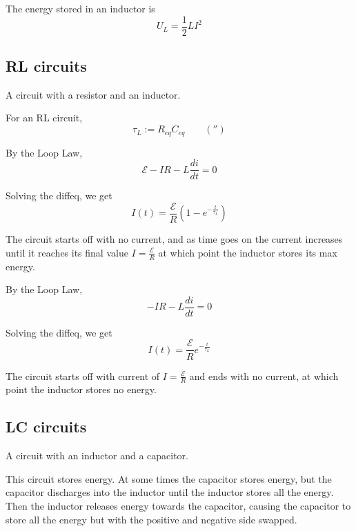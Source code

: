 \begin{theorem}
  The energy stored in an inductor is
  \[
    U_L = \frac{1}{2} LI^2
  \]
\end{theorem}

\subsection{RL circuits}

\begin{definition}[RL circuit]
  A circuit with a resistor and an inductor.
\end{definition}

\begin{definition}
  For an RL circuit,
  \[
    \tau_L := R_{eq} C_{eq} \qquad (\second)
  \]
\end{definition}

\begin{theorem}
  By the Loop Law,
  \[
    \mathcal{E} - IR - L \frac{di}{dt} = 0
  \]

  Solving the diffeq, we get
  \[
    I(t) = \frac{\mathcal{E}}{R} \left(1 - e^{- \frac{t}{\tau_L}}\right)
  \]

  The circuit starts off with no current, and as time goes on the current increases until it reaches its final value $I = \frac{\mathcal{E}}{R}$ at which point the inductor stores its max energy.
\end{theorem}

\begin{theorem}
  By the Loop Law,
  \[
    - IR - L \frac{di}{dt} = 0
  \]

  Solving the diffeq, we get
  \[
    I(t) = \frac{\mathcal{E}}{R} e^{- \frac{t}{\tau_L}}
  \]

  The circuit starts off with current of $I = \frac{\mathcal{E}}{R}$ and ends with no current, at which point the inductor stores no energy.
\end{theorem}

\subsection{LC circuits}

\begin{definition}[LC circuit]
  A circuit with an inductor and a capacitor.

  This circuit stores energy. At some times the capacitor stores energy, but the capacitor discharges into the inductor until the inductor stores all the energy. Then the inductor releases energy towards the capacitor, causing the capacitor to store all the energy but with the positive and negative side swapped.
\end{definition}

